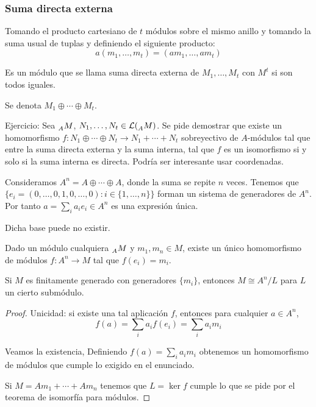 \subsubsection{Suma directa externa}

\begin{df}
Tomando el producto cartesiano de \(t\) módulos sobre el mismo anillo
y tomando la suma usual de tuplas y definiendo el siguiente producto:
\[
  a(m_1,\ldots, m_t)=(am_1,\ldots,am_t)
\]

Es un módulo que se llama suma directa externa de \(M_1,\ldots, M_t\)
con \(M^t\) si son todos iguales.

  Se denota \(M_1\oplus\cdots\oplus M_t\).
\end{df}


Ejercicio: Sea \(\prescript{}{A}{M}\), \(N_1,\ldots,
N_t\in\mathcal{L}(\prescript{}{A}{M})\). Se pide demostrar que existe
un homomorfismo \(f:N_1\oplus\cdots\oplus N_t\longrightarrow
N_1{+}\cdots{+}N_t\)
sobreyectivo de \(A\)-módulos tal que entre la suma directa
externa y la suma interna, tal que \(f\) es un isomorfismo si y solo si
la suma interna es directa. Podría ser interesante usar coordenadas.
\begin{df}
  Consideramos \(A^n=A\oplus\cdots\oplus A\), donde la suma se repite
  \(n\) veces. Tenemos que \(\{e_i = (0,\ldots, 0,1,0, \ldots, 0) : i \in \{1, \ldots, n\}\}
  \) forman un sistema de
  generadores de \(A^n\). Por tanto \(a=\sum_i a_i e_i\in A^n\)
  es una expresión única.
\end{df}

Dicha base puede no existir.

\begin{prop}
  Dado un módulo cualquiera \(\prescript{}{A}{M}\) y \(m_1, m_n\in M\),
  existe un único homomorfismo de módulos \(f:A^n\longrightarrow M\)
  tal que \(f(e_i)=m_i\).
\end{prop}

\begin{cor}
  Si \(M\) es finitamente generado con generadores \(\{m_i\}\),
  entonces \(M\cong A^n/L\) para \(L\) un cierto submódulo.
\end{cor}

\begin{proof}
  Unicidad: si existe una tal aplicación \(f\), entonces para
  cualquier \(a\in A^n\),
  \[
    f(a)=\sum_i a_i f(e_i)=\sum_i a_i m_i
  \]

  Veamos la existencia,
  Definiendo \(f(a)=\sum_i a_i m_i\) obtenemos un homomorfismo de módulos
  que cumple lo exigido en el enunciado.

  Si \(M=Am_1+\cdots+Am_n\) tenemos que \(L=\ker f\) cumple lo que se
  pide por el teorema de isomorfía para módulos.
\end{proof}